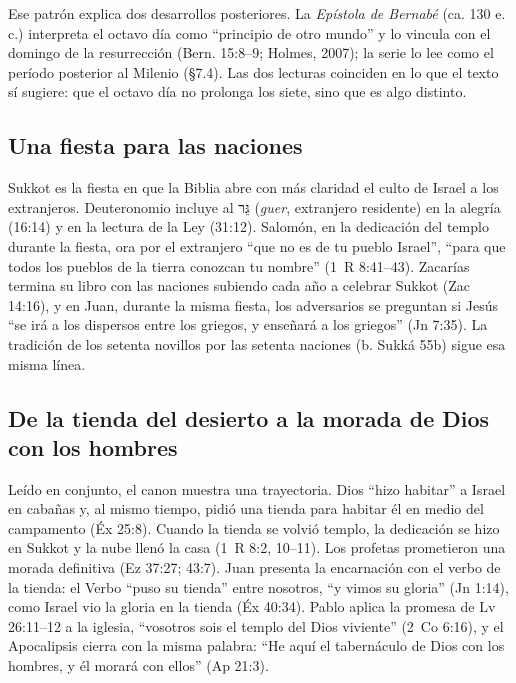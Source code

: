 \documentclass[11pt,letterpaper]{article}
\newcommand{\heb}[1]{\mbox{\foreignlanguage{hebrew}{#1}}}
\begin{document}
Ese patrón explica dos desarrollos posteriores. La \emph{Epístola de Bernabé} (ca. 130 e.\,c.) interpreta el octavo día como ``principio de otro mundo'' y lo vincula con el domingo de la resurrección (Bern. 15:8--9; Holmes, 2007); la serie lo lee como el período posterior al Milenio (§7.4). Las dos lecturas coinciden en lo que el texto sí sugiere: que el octavo día no prolonga los siete, sino que es algo distinto.

\subsection{Una fiesta para las naciones}
Sukkot es la fiesta en que la Biblia abre con más claridad el culto de Israel a los extranjeros. Deuteronomio incluye al \heb{גֵּר} (\emph{guer}, extranjero residente) en la alegría (16:14) y en la lectura de la Ley (31:12). Salomón, en la dedicación del templo durante la fiesta, ora por el extranjero ``que no es de tu pueblo Israel'', ``para que todos los pueblos de la tierra conozcan tu nombre'' (1~R 8:41--43). Zacarías termina su libro con las naciones subiendo cada año a celebrar Sukkot (Zac 14:16), y en Juan, durante la misma fiesta, los adversarios se preguntan si Jesús ``se irá a los dispersos entre los griegos, y enseñará a los griegos'' (Jn 7:35). La tradición de los setenta novillos por las setenta naciones (b. Sukká 55b) sigue esa misma línea.

\subsection{De la tienda del desierto a la morada de Dios con los hombres}
Leído en conjunto, el canon muestra una trayectoria. Dios ``hizo habitar'' a Israel en cabañas y, al mismo tiempo, pidió una tienda para habitar él en medio del campamento (Éx 25:8). Cuando la tienda se volvió templo, la dedicación se hizo en Sukkot y la nube llenó la casa (1~R 8:2, 10--11). Los profetas prometieron una morada definitiva (Ez 37:27; 43:7). Juan presenta la encarnación con el verbo de la tienda: el Verbo ``puso su tienda'' entre nosotros, ``y vimos su gloria'' (Jn 1:14), como Israel vio la gloria en la tienda (Éx 40:34). Pablo aplica la promesa de Lv 26:11--12 a la iglesia, ``vosotros sois el templo del Dios viviente'' (2~Co 6:16), y el Apocalipsis cierra con la misma palabra: ``He aquí el tabernáculo de Dios con los hombres, y él morará con ellos'' (Ap 21:3).
\end{document}
